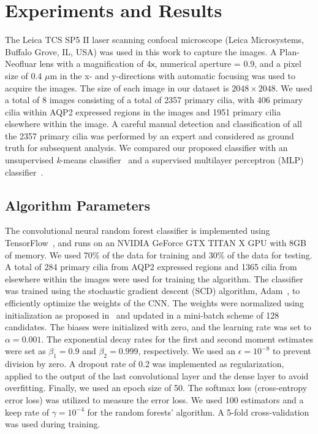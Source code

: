 \section{Experiments and Results}

The Leica TCS SP5 II laser scanning confocal microscope (Leica Microsystems, Buffalo Grove, IL, USA) was used in this work to capture the images. A Plan-Neofluar lens with a magnification of 4$\textsf{x}$, numerical aperture = 0.9, and a pixel size of 0.4 $\mu$m in the x- and y-directions with automatic focusing was used to acquire the images. The size of each image in our dataset is $2048 \times 2048$. We used a total of 8 images consisting of a total of 2357 primary cilia, with 406 primary cilia within AQP2 expressed regions in the images and 1951 primary cilia elsewhere within the image. A careful manual detection and classification of all the 2357 primary cilia was performed by an expert and considered as ground truth for subsequent analysis. We compared our proposed classifier with an unsupervised \emph{k}-means classifier~\cite{dundar_Simplicity_2015} and a supervised multilayer perceptron (MLP) classifier~\cite{haykin_Neural_2009}.

\subsection{Algorithm Parameters}

The convolutional neural random forest classifier is implemented using TensorFlow~\cite{abadi_tensorflowlarge_2016}, and runs on an NVIDIA GeForce GTX TITAN X GPU with 8GB of memory. We used 70\% of the data for training and 30\% of the data for testing. A total of 284 primary cilia from AQP2 expressed regions and 1365 cilia from elsewhere within the images were used for training the algorithm. The classifier was trained using the stochastic gradient descent (SCD) algorithm, Adam~\cite{kingma_Adam_2014}, to efficiently optimize the weights of the CNN\@. The weights were normalized using initialization as proposed in~\cite{gupta_Convolutional_2017} and updated in a mini-batch scheme of 128 candidates. The biases were initialized with zero, and the learning rate was set to $\alpha = 0.001$. The exponential decay rates for the first and second moment estimates were set as $\beta_{1} = 0.9$ and $\beta_{2} = 0.999$, respectively. We used an $\epsilon = 10^{-8}$ to prevent division by zero. A dropout rate of 0.2 was implemented as regularization, applied to the output of the last convolutional layer and the dense layer to avoid overfitting. Finally, we used an epoch size of 50. The softmax loss (cross-entropy error loss) was utilized to measure the error loss. We used 100 estimators and a keep rate of $\gamma = 10^{-4}$ for the random forests' algorithm. A 5-fold cross-validation was used during training.%

